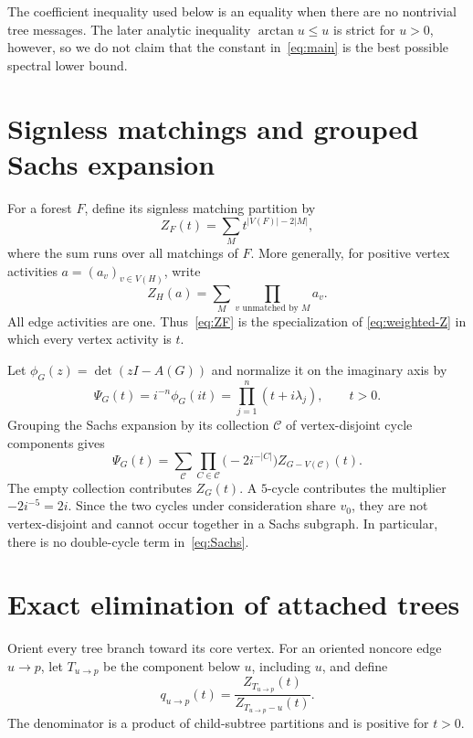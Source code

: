 \documentclass[11pt]{article}
\theoremstyle{remark}
\begin{document}
The coefficient inequality used below is an equality when there are no
nontrivial tree messages.  The later analytic inequality
$\arctan u\leq u$ is strict for $u>0$, however, so we do not claim that the
constant in~\eqref{eq:main} is the best possible spectral lower bound.

\section{Signless matchings and grouped Sachs expansion}

For a forest $F$, define its signless matching partition by
\begin{equation}\label{eq:ZF}
 Z_F(t)=\sum_{M}t^{|V(F)|-2|M|},
\end{equation}
where the sum runs over all matchings of $F$.  More generally, for positive
vertex activities $a=(a_v)_{v\in V(H)}$, write
\begin{equation}\label{eq:weighted-Z}
 Z_H(a)=\sum_M\prod_{v\text{ unmatched by }M}a_v.
\end{equation}
All edge activities are one.  Thus~\eqref{eq:ZF} is the specialization of
\eqref{eq:weighted-Z} in which every vertex activity is $t$.

Let $\phi_G(z)=\det(zI-A(G))$ and normalize it on the imaginary axis by
\begin{equation}\label{eq:Psi}
 \Psi_G(t)=i^{-n}\phi_G(it)=\prod_{j=1}^n(t+i\lambda_j),
 \qquad t>0.
\end{equation}
Grouping the Sachs expansion by its collection $\mathcal C$ of
vertex-disjoint cycle components gives
\begin{equation}\label{eq:Sachs}
 \Psi_G(t)=
 \sum_{\mathcal C}
 \prod_{C\in\mathcal C}\bigl(-2i^{-|C|}\bigr)
 Z_{G-V(\mathcal C)}(t).
\end{equation}
The empty collection contributes $Z_G(t)$.  A $5$-cycle contributes the
multiplier $-2i^{-5}=2i$.  Since the two cycles under consideration share
$v_0$, they are not vertex-disjoint and cannot occur together in a Sachs
subgraph.  In particular, there is no double-cycle term in~\eqref{eq:Sachs}.

\section{Exact elimination of attached trees}

Orient every tree branch toward its core vertex.  For an oriented noncore
edge $u\to p$, let $T_{u\to p}$ be the component below $u$, including $u$,
and define
\begin{equation}\label{eq:q-definition}
 q_{u\to p}(t)=
 \frac{Z_{T_{u\to p}}(t)}{Z_{T_{u\to p}-u}(t)}.
\end{equation}
The denominator is a product of child-subtree partitions and is positive for
$t>0$.
\end{document}
